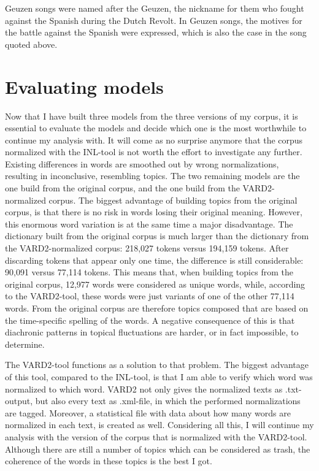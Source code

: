 \noindent Geuzen songs were named after the Geuzen, the nickname for them who fought against the Spanish during the Dutch Revolt. In Geuzen songs, the motives for the battle against the Spanish were expressed, which is also the case in the song quoted above.

\section{Evaluating models}
Now that I have built three models from the three versions of my corpus, it is essential to evaluate the models and decide which one is the most worthwhile to continue my analysis with. It will come as no surprise anymore that the corpus normalized with the INL-tool is not worth the effort to investigate any further. Existing differences in words are smoothed out by wrong normalizations, resulting in inconclusive, resembling topics. The two remaining models are the one build from the original corpus, and the one build from the VARD2-normalized corpus. The biggest advantage of building topics from the original corpus, is that there is no risk in words losing their original meaning. However, this enormous word variation is at the same time a major disadvantage. The dictionary built from the original corpus is much larger than the dictionary from the VARD2-normalized corpus: 218,027 tokens versus 194,159 tokens. After discarding tokens that appear only one time, the difference is still considerable: 90,091 versus 77,114 tokens. This means that, when building topics from the original corpus, 12,977 words were considered as unique words, while, according to the VARD2-tool, these words were just variants of one of the other 77,114 words. From the  original corpus are therefore topics composed that are based on the time-specific spelling of the words. A negative consequence of this is that diachronic patterns in topical fluctuations are harder, or in fact impossible, to determine.

The VARD2-tool functions as a solution to that problem. The biggest advantage of this tool, compared to the INL-tool, is that I am able to verify which word was normalized to which word. VARD2 not only gives the normalized texts as .txt-output, but also every text as .xml-file, in which the performed normalizations are tagged. Moreover, a statistical file with data about how many words are normalized in each text, is created as well. Considering all this, I will continue my analysis with the version of the corpus that is normalized with the VARD2-tool. Although there are still a number of topics which can be considered as trash, the coherence of the words in these topics is the best I got.

